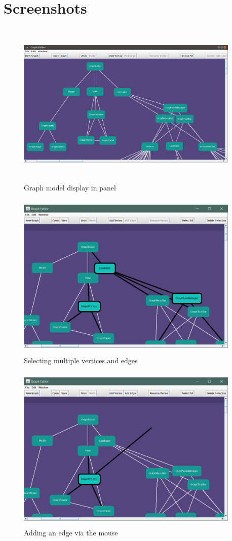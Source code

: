 \documentclass[a4paper]{article}
\begin{document}
\newpage
\section{Screenshots}
\begin{figure}[h!]
            \centering
            \includegraphics[height=8cm,width=0.95\textwidth]{im/mvc.png}
            \caption{Graph model display in panel}
            \label{fig: mvc}
\end{figure}
\begin{figure}[h!]
            \centering
            \includegraphics[height=8cm,width=0.95\textwidth]{im/sel.png}
            \caption{Selecting multiple vertices and edges}
            \label{fig: sel}
\end{figure}
\begin{figure}[h!]
            \centering
            \includegraphics[height=8cm,width=0.95\textwidth]{im/addEdge.png}
            \caption{Adding an edge via the mouse}
            \label{fig: addE}
\end{figure}
\end{document}
